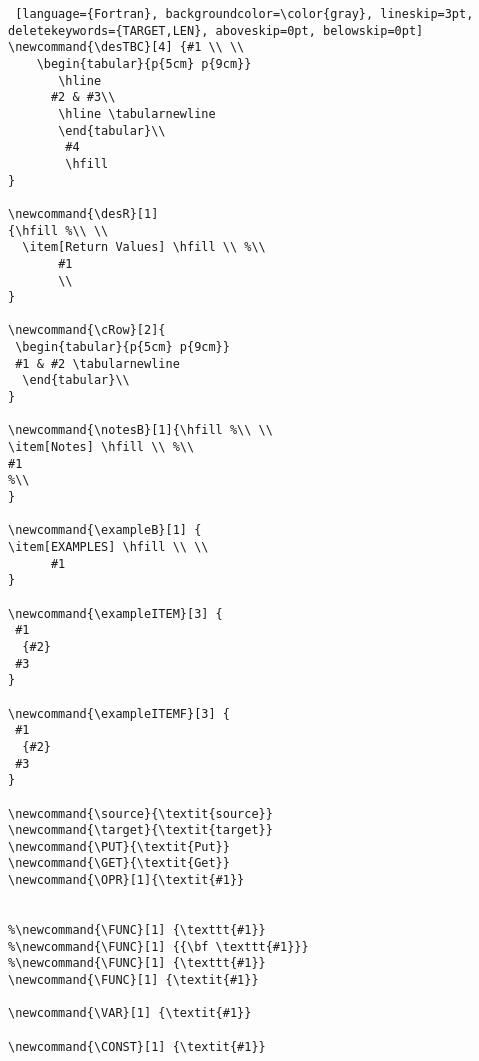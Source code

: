 {\begin{lstlisting} [language={Fortran}, backgroundcolor=\color{gray}, lineskip=3pt, deletekeywords={TARGET,LEN}, aboveskip=0pt, belowskip=0pt]
\newcommand{\desTBC}[4] {#1 \\ \\
    \begin{tabular}{p{5cm} p{9cm}}
       \hline
      #2 & #3\\
       \hline \tabularnewline
       \end{tabular}\\
        #4
        \hfill
} 

\newcommand{\desR}[1]
{\hfill %\\ \\
  \item[Return Values] \hfill \\ %\\
       #1 
       \\
}

\newcommand{\cRow}[2]{
 \begin{tabular}{p{5cm} p{9cm}}
 #1 & #2 \tabularnewline
  \end{tabular}\\
}

\newcommand{\notesB}[1]{\hfill %\\ \\
\item[Notes] \hfill \\ %\\
#1
%\\
}

\newcommand{\exampleB}[1] {
\item[EXAMPLES] \hfill \\ \\
      #1
}

\newcommand{\exampleITEM}[3] {
 #1
  {#2}	
 #3  
}

\newcommand{\exampleITEMF}[3] {
 #1
  {#2}
 #3 
}

\newcommand{\source}{\textit{source}}
\newcommand{\target}{\textit{target}}
\newcommand{\PUT}{\textit{Put}}
\newcommand{\GET}{\textit{Get}}
\newcommand{\OPR}[1]{\textit{#1}}


%\newcommand{\FUNC}[1] {\texttt{#1}}
%\newcommand{\FUNC}[1] {{\bf \texttt{#1}}}
%\newcommand{\FUNC}[1] {\texttt{#1}}
\newcommand{\FUNC}[1] {\textit{#1}}

\newcommand{\VAR}[1] {\textit{#1}}

\newcommand{\CONST}[1] {\textit{#1}}


\end{lstlisting}}
